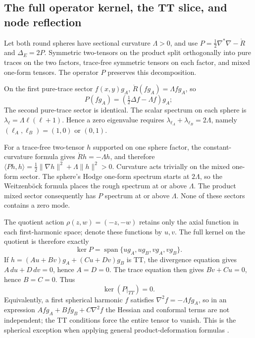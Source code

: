 \documentclass[a4paper,11pt]{article}
\numberwithin{equation}{section}
\theoremstyle{definition}
\begin{document}
\subsection{The full operator kernel, the TT slice, and node reflection}\label{sec:fullkernel}
Let both round spheres have sectional curvature $\Lambda>0$, and use
$P=\frac12\nabla^*\nabla-\mathring R$ and $\Delta_E=2P$.
Symmetric two-tensors on the product split orthogonally into pure traces on the two factors, trace-free symmetric tensors on each factor, and mixed one-form tensors. The operator $P$ preserves this decomposition.

On the first pure-trace sector $f(x,y)g_A$, $\mathring R(fg_A)=\Lambda fg_A$, so
\[
P(fg_A)=\left(\tfrac12\Delta f-\Lambda f\right)g_A;
\]
The second pure-trace sector is identical. The scalar spectrum on each sphere is
$\lambda_\ell=\Lambda\ell(\ell+1)$. Hence a zero eigenvalue requires
$\lambda_{\ell_A}+\lambda_{\ell_B}=2\Lambda$, namely
$(\ell_A,\ell_B)=(1,0)$ or $(0,1)$.

For a trace-free two-tensor $h$ supported on one sphere factor, the constant-curvature formula gives
$\mathring Rh=-\Lambda h$, and therefore
$\langle Ph,h\rangle=\frac12\|\nabla h\|^2+\Lambda\|h\|^2>0$.
Curvature acts trivially on the mixed one-form sector. The sphere's Hodge one-form spectrum starts at $2\Lambda$, so the Weitzenb\"ock formula places the rough spectrum at or above $\Lambda$. The product mixed sector consequently has $P$ spectrum at or above $\Lambda$. None of these sectors contains a zero mode.

The quotient action $\rho(z,w)=(-z,-w)$ retains only the axial function in each first-harmonic space; denote these functions by $u,v$. The full kernel on the quotient is therefore exactly
\begin{equation}\label{eq:fullkernel}
\ker P=\operatorname{span}\{ug_A,ug_B,vg_A,vg_B\}.
\end{equation}
If
$h=(Au+Bv)g_A+(Cu+Dv)g_B$
is TT, the divergence equation gives $A\,du+D\,dv=0$, hence $A=D=0$.
The trace equation then gives $Bv+Cu=0$, hence $B=C=0$. Thus
\begin{equation}\label{eq:ttkernel}
\ker(P|_{TT})=0.
\end{equation}
Equivalently, a first spherical harmonic $f$ satisfies
$\nabla^2f=-\Lambda fg_A$, so in an expression
$Afg_A+Bfg_B+C\nabla^2f$
the Hessian and conformal terms are not independent; the TT conditions force the entire tensor to vanish. This is the spherical exception when applying general product-deformation formulas \cite{Kroncke}.
\end{document}
